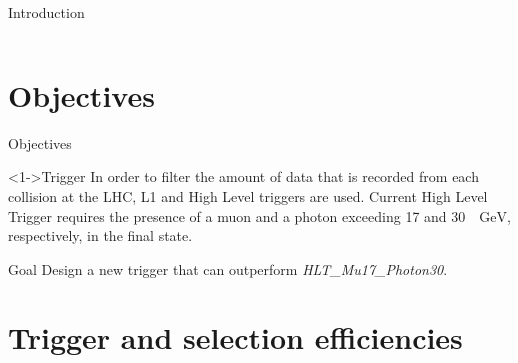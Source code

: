 \documentclass[aspectratio = 1610, xcolor = dvipsnames]{beamer}
\newcommand{\GeV}{\textrm{ }\mathrm{GeV}}
\newcommand{\red}{\textcolor{unipd}}
\begin{document}
\begin{frame}[t]{Introduction}
\begin{columns}[c]
        \end{columns}


	\end{frame}
	
	
    \section{Objectives}

    \begin{frame}[t]{Objectives}

        \begin{block}<1->{Trigger}
            In order to filter the amount of data that is recorded from each collision at the LHC, L1 and High Level triggers are used. Current High Level Trigger requires the presence of a muon and a photon exceeding 17 and 30 $\GeV$, respectively, in the final state.
        \end{block}
        
        \vspace{1cm}
        
        \begin{alertblock}{\red{Goal}}
            Design a new trigger that can outperform {\it HLT\_Mu17\_Photon30}.
        \end{alertblock}

    \end{frame}
	
	
	\section{Trigger and selection efficiencies}
    
\end{document}
